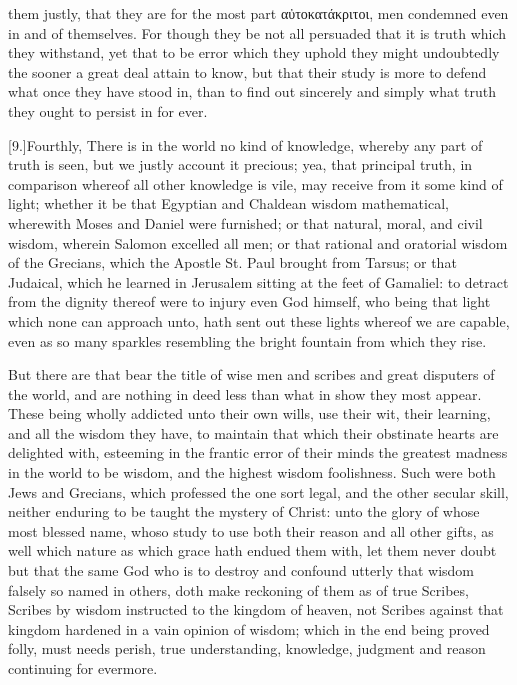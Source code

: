 them justly, that they are for the most part αὐτοκατάκριτοι, men condemned even in and of themselves. For though they be not all persuaded that it is truth which they withstand, yet that to be error which they uphold they might undoubtedly the sooner a great deal attain to know, but that their study is more to defend what once they have stood in, than to find out sincerely and simply what truth they ought to persist in for ever.

[9.]Fourthly, There is in the world no kind of knowledge, whereby any part of truth is seen, but we justly account it precious; yea, that principal truth, in comparison whereof all other knowledge is vile, may receive from it some kind of light; whether it be that Egyptian and Chaldean wisdom mathematical, wherewith Moses and Daniel were furnished; or that natural, moral, and civil wisdom, wherein Salomon excelled all men; or that rational and oratorial wisdom of the Grecians, which the Apostle St. Paul brought from Tarsus; or that Judaical, which he learned in Jerusalem sitting at the feet of Gamaliel: to detract from the dignity thereof were to injury even God himself, who being that light which none can approach unto, hath sent out these lights whereof we are capable, even as so many sparkles resembling the bright fountain from which they rise.

But there are that bear the title of wise men and scribes and great disputers of the world, and are nothing in deed less than what in show they most appear. These being wholly addicted unto their own wills, use their wit, their learning, and all the wisdom they have, to maintain that which their  obstinate hearts are delighted with, esteeming in the frantic error of their minds the greatest madness in the world to be wisdom, and the highest wisdom foolishness. Such were both Jews and Grecians, which professed the one sort legal, and the other secular skill, neither enduring to be taught the mystery of Christ: unto the glory of whose most blessed name, whoso study to use both their reason and all other gifts, as well which nature as which grace hath endued them with, let them never doubt but that the same God who is to destroy and confound utterly that wisdom falsely so named in others, doth make reckoning of them as of true Scribes, Scribes by wisdom instructed to the kingdom of heaven, not Scribes against that kingdom hardened in a vain opinion of wisdom; which in the end being proved folly, must needs perish, true understanding, knowledge, judgment and reason continuing for evermore.

